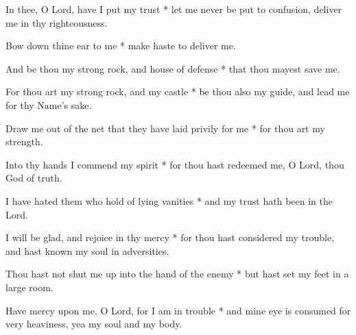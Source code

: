 In thee, O Lord, have I put my trust * let me never be put to confusion, deliver me in thy righteousness.

Bow down thine ear to me * make haste to deliver me.

And be thou my strong rock, and house of defense * that thou mayest save me.

For thou art my strong rock, and my castle * be thou also my guide, and lead me for thy Name's sake.

Draw me out of the net that they have laid privily for me * for thou art my strength.

Into thy hands I commend my spirit * for thou hast redeemed me, O Lord, thou God of truth.

I have hated them who hold of lying vanities * and my trust hath been in the Lord.

I will be glad, and rejoice in thy mercy * for thou hast considered my trouble, and hast known my soul in adversities.

Thou hast not shut me up into the hand of the enemy * but hast set my feet in a large room.

Have mercy upon me, O Lord, for I am in trouble * and mine eye is consumed for very heaviness, yea my soul and my body.